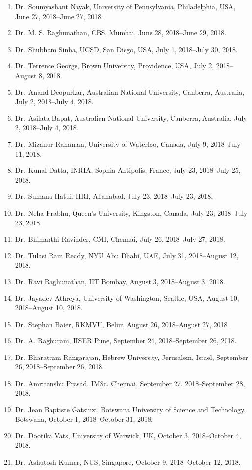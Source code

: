 \begin{enumerate}
\item Dr.~Soumyashant Nayak, University of Pennsylvania, Philadelphia, USA, June 27, 2018--June 27, 2018.
\item Dr.~M. S. Raghunathan, CBS, Mumbai, June 28, 2018--June 29, 2018.
\item Dr.~Shubham Sinha, UCSD, San Diego, USA, July 1, 2018--July 30, 2018.
\item Dr.~Terrence George, Brown University, Providence, USA, July 2, 2018--August 8, 2018.
\item Dr.~Anand Deopurkar, Australian National University, Canberra, Australia, July 2, 2018--July 4, 2018.
\item Dr.~Asilata Bapat, Australian National University, Canberra, Australia, July 2, 2018--July 4, 2018.
\item Dr.~Mizanur Rahaman, University of Waterloo, Canada, July 9, 2018--July 11, 2018.
\item Dr.~Kunal Datta, INRIA, Sophia-Antipolis, France, July 23, 2018--July 25, 2018.
\item Dr.~Sumana Hatui, HRI, Allahabad, July 23, 2018--July 23, 2018.
\item Dr.~Neha Prabhu, Queen's University, Kingston, Canada, July 23, 2018--July 23, 2018.
\item Dr.~Bhimarthi Ravinder, CMI, Chennai, July 26, 2018--July 27, 2018.
\item Dr.~Tulasi Ram Reddy, NYU Abu Dhabi, UAE, July 31, 2018--August 12, 2018.
\item Dr.~Ravi Raghunathan, IIT Bombay, August 3, 2018--August 3, 2018.
\item Dr.~Jayadev Athreya, University of Washington, Seattle, USA, August 10, 2018--August 10, 2018.
\item Dr.~Stephan Baier, RKMVU, Belur, August 26, 2018--August 27, 2018.
\item Dr.~A. Raghuram, IISER Pune, September 24, 2018--September 26, 2018.
\item Dr.~Bharatram Rangarajan, Hebrew University, Jerusalem, Israel, September 26, 2018--September 26, 2018.
\item Dr.~Amritanshu Prasad, IMSc, Chennai, September 27, 2018--September 28, 2018.
\item Dr.~Jean Baptiste Gatsinzi, Botswana University of Science and Technology, Botswana, October 1, 2018--October 31, 2018.
\item Dr.~Dootika Vats, University of Warwick, UK, October 3, 2018--October 4, 2018.
\item Dr.~Ashutosh Kumar, NUS, Singapore, October 9, 2018--October 12, 2018.

\end{enumerate}
